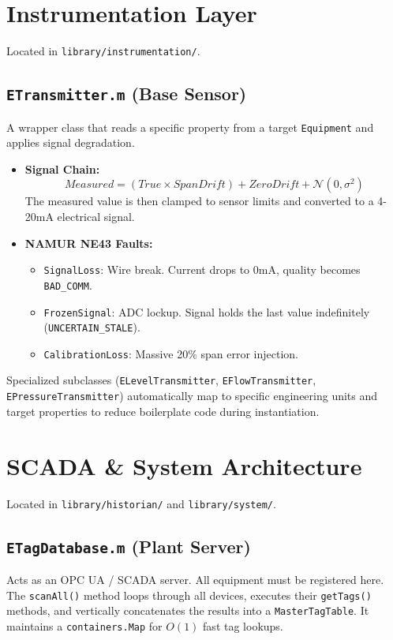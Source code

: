 \documentclass[11pt,a4paper]{report}
\begin{document}
\chapter{Instrumentation Layer}
Located in \texttt{library/instrumentation/}.

\section{\texttt{ETransmitter.m} (Base Sensor)}
A wrapper class that reads a specific property from a target \texttt{Equipment} and applies signal degradation.
\begin{itemize}
    \item \textbf{Signal Chain:} 
    $$ Measured = (True \times SpanDrift) + ZeroDrift + \mathcal{N}(0, \sigma^2) $$
    The measured value is then clamped to sensor limits and converted to a 4-20mA electrical signal.
    \item \textbf{NAMUR NE43 Faults:}
    \begin{itemize}
        \item \texttt{SignalLoss}: Wire break. Current drops to 0mA, quality becomes \texttt{BAD\_COMM}.
        \item \texttt{FrozenSignal}: ADC lockup. Signal holds the last value indefinitely (\texttt{UNCERTAIN\_STALE}).
        \item \texttt{CalibrationLoss}: Massive 20\% span error injection.
    \end{itemize}
\end{itemize}

Specialized subclasses (\texttt{ELevelTransmitter}, \texttt{EFlowTransmitter}, \texttt{EPressureTransmitter}) automatically map to specific engineering units and target properties to reduce boilerplate code during instantiation.

\chapter{SCADA \& System Architecture}
Located in \texttt{library/historian/} and \texttt{library/system/}.

\section{\texttt{ETagDatabase.m} (Plant Server)}
Acts as an OPC UA / SCADA server. All equipment must be registered here. The \texttt{scanAll()} method loops through all devices, executes their \texttt{getTags()} methods, and vertically concatenates the results into a \texttt{MasterTagTable}. It maintains a \texttt{containers.Map} for $O(1)$ fast tag lookups.
\end{document}
